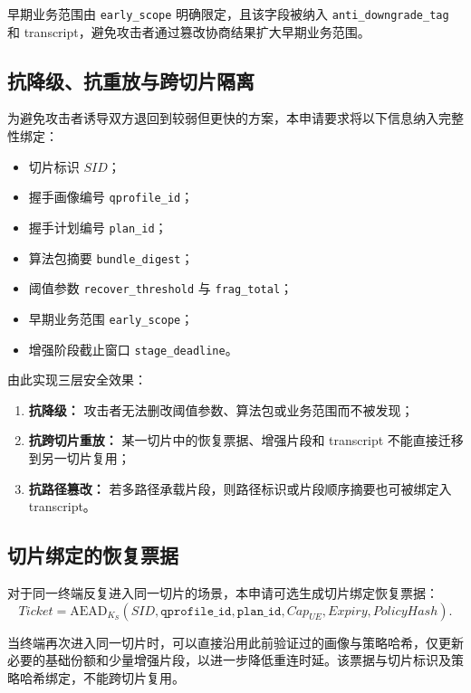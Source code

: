 \documentclass[12pt,a4paper]{article}
\begin{document}
早期业务范围由 \texttt{early\_scope} 明确限定，且该字段被纳入 \texttt{anti\_downgrade\_tag} 和 transcript，避免攻击者通过篡改协商结果扩大早期业务范围。

\subsection{抗降级、抗重放与跨切片隔离}

为避免攻击者诱导双方退回到较弱但更快的方案，本申请要求将以下信息纳入完整性绑定：

\begin{itemize}[leftmargin=2em]
    \item 切片标识 $SID$；
    \item 握手画像编号 \texttt{qprofile\_id}；
    \item 握手计划编号 \texttt{plan\_id}；
    \item 算法包摘要 \texttt{bundle\_digest}；
    \item 阈值参数 \texttt{recover\_threshold} 与 \texttt{frag\_total}；
    \item 早期业务范围 \texttt{early\_scope}；
    \item 增强阶段截止窗口 \texttt{stage\_deadline}。
\end{itemize}

由此实现三层安全效果：

\begin{enumerate}[leftmargin=2em]
    \item \textbf{抗降级：} 攻击者无法删改阈值参数、算法包或业务范围而不被发现；
    \item \textbf{抗跨切片重放：} 某一切片中的恢复票据、增强片段和 transcript 不能直接迁移到另一切片复用；
    \item \textbf{抗路径篡改：} 若多路径承载片段，则路径标识或片段顺序摘要也可被绑定入 transcript。
\end{enumerate}

\subsection{切片绑定的恢复票据}

对于同一终端反复进入同一切片的场景，本申请可选生成切片绑定恢复票据：
\[
Ticket = \mathrm{AEAD}_{K_S}(SID, \texttt{qprofile\_id}, \texttt{plan\_id}, Cap_{UE}, Expiry, PolicyHash).
\]

当终端再次进入同一切片时，可以直接沿用此前验证过的画像与策略哈希，仅更新必要的基础份额和少量增强片段，以进一步降低重连时延。该票据与切片标识及策略哈希绑定，不能跨切片复用。
\end{document}
